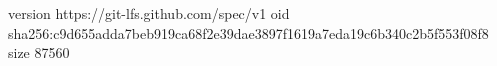 version https://git-lfs.github.com/spec/v1
oid sha256:c9d655adda7beb919ca68f2e39dae3897f1619a7eda19c6b340c2b5f553f08f8
size 87560
